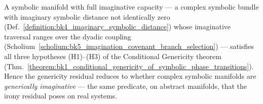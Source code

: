 \begin{proposition}
\label{proposition:bk1_imagination_supplies_effective_dimension}
\label{proposition:bk1_imagination_supplies_genericity_hypotheses}
A symbolic manifold with full imaginative capacity --- a complex symbolic bundle
with imaginary symbolic distance not identically zero
(Def.~\ref{definition:bk4_imaginary_symbolic_distance}) whose imaginative
traversal ranges over the dyadic coupling
(Scholium~\ref{scholium:bk5_imagination_covenant_branch_selection}) --- satisfies
all three hypotheses (H1)--(H3) of the Conditional Genericity theorem
(Thm.~\ref{theorem:bk1_conditional_genericity_of_symbolic_phase_transitions}).
Hence the genericity residual reduces to whether complex symbolic manifolds are
\emph{generically imaginative} --- the same predicate, on abstract manifolds,
that the irony residual poses on real systems.
\end{proposition}
